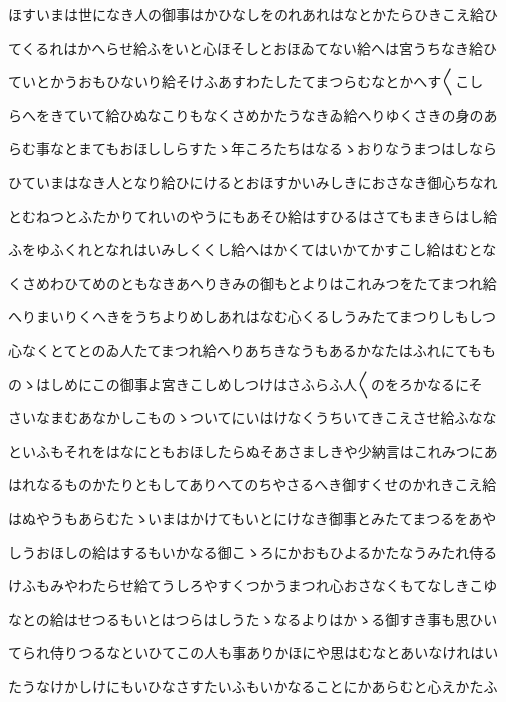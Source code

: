 \documentclass[a4paper,11pt,landscape]{ltjtarticle}
\begin{document}
\par\medskip
ほすいまは世になき人の御事はかひなしをのれあれはなとかたらひきこえ給ひ
\par\medskip
てくるれはかへらせ給ふをいと心ほそしとおほゐてない給へは宮うちなき給ひ
\par\medskip
ていとかうおもひないり給そけふあすわたしたてまつらむなとかへす〱こし
\par\medskip
らへをきていて給ひぬなこりもなくさめかたうなきゐ給へりゆくさきの身のあ
\par\medskip
らむ事なとまてもおほししらすたゝ年ころたちはなるゝおりなうまつはしなら
\par\medskip
ひていまはなき人となり給ひにけるとおほすかいみしきにおさなき御心ちなれ
\par\medskip
とむねつとふたかりてれいのやうにもあそひ給はすひるはさてもまきらはし給
\par\medskip
ふをゆふくれとなれはいみしくくし給へはかくてはいかてかすこし給はむとな
\par\medskip
くさめわひてめのともなきあへりきみの御もとよりはこれみつをたてまつれ給
\par\medskip
へりまいりくへきをうちよりめしあれはなむ心くるしうみたてまつりしもしつ
\par\medskip
心なくとてとのゐ人たてまつれ給へりあちきなうもあるかなたはふれにてもも
\par\medskip
のゝはしめにこの御事よ宮きこしめしつけはさふらふ人〱のをろかなるにそ
\par\medskip
さいなまむあなかしこものゝついてにいはけなくうちいてきこえさせ給ふなな
\par\medskip
といふもそれをはなにともおほしたらぬそあさましきや少納言はこれみつにあ
\par\medskip
はれなるものかたりともしてありへてのちやさるへき御すくせのかれきこえ給
\par\medskip
はぬやうもあらむたゝいまはかけてもいとにけなき御事とみたてまつるをあや
\par\medskip
しうおほしの給はするもいかなる御こゝろにかおもひよるかたなうみたれ侍る
\par\medskip
けふもみやわたらせ給てうしろやすくつかうまつれ心おさなくもてなしきこゆ
\par\medskip
なとの給はせつるもいとはつらはしうたゝなるよりはかゝる御すき事も思ひい
\par\medskip
てられ侍りつるなといひてこの人も事ありかほにや思はむなとあいなけれはい
\par\medskip
たうなけかしけにもいひなさすたいふもいかなることにかあらむと心えかたふ
\end{document}
